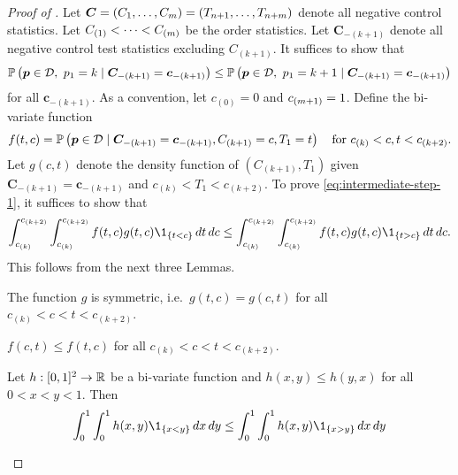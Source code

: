 \begin{proof}[Proof of ]
Let $\bm C = (C_1,\dotsc,C_{m}) = (T_{{n}+1}, \dotsc,
T_{{n}+m})$ denote all negative control statistics. Let $C_{(1)} <
\dotsb < C_{(m)}$ be the order statistics. Let
$\boldsymbol{C}_{-(k+1)}$ denote all negative control test
statistics excluding $C_{(k+1)}$. It suffices to show that
\begin{align} \label{eq:intermediate-step-1}
    \mathbb{P}\left({\boldsymbol{p}} \in \mathcal{D}, ~{p_{1}} = k \mid \boldsymbol{C}_{-(k+1)}
  = \boldsymbol{c}_{-(k+1)}\right) \le \mathbb{P}\left({\boldsymbol{p}} \in \mathcal{D}, ~{p_{1}} =
  k+1 \mid \boldsymbol{C}_{-(k+1)} = \boldsymbol{c}_{-(k+1)}\right)
\end{align}
for all $\bm c_{-(k+1)}$. As a convention, let $c_{(0)} = 0$ and
$c_{(m+1)} = 1$. Define the bi-variate function
\begin{align*}
    f(t, c) = \mathbb{P}\left({\boldsymbol{p}} \in \mathcal{D} \mid \boldsymbol{C}_{-(k+1)}
  = \boldsymbol{c}_{-(k+1)}, C_{(k+1)} = c, {T_{1}} = t
  \right) \quad \text{for}~c_{(k)} < c, t < c_{(k+2)}.
\end{align*}
Let $g(c,t)$ denote the density function of $(C_{(k+1)}, T_1)$ given
$\boldsymbol{C}_{-(k+1)} = \boldsymbol{c}_{-(k+1)}$ and $c_{(k)} < T_1
< c_{(k+2)}$.
To prove \eqref{eq:intermediate-step-1}, it suffices to show that
\[
  \int_{c_{(k)}}^{c_{(k+2)}} \int_{c_{(k)}}^{c_{(k+2)}} f(t,c) g(t,c) \1_{\{t
    < c\}} \,dt\, dc \leq \int_{c_{(k)}}^{c_{(k+2)}}
  \int_{c_{(k)}}^{c_{(k+2)}} f(t,c) g(t,c) \1_{\{t > c\}} \,dt\,dc.
\]
This follows from the next three Lemmas.

\begin{lemma} \label{lemm:symmetric-g}
The function $g$ is symmetric, i.e.\ $g(t,c) = g(c,t)$ for all
$c_{(k)} < c < t < c_{(k+2)}$.
\end{lemma}

\begin{lemma} \label{lemm:symmetric-inequality}
  $f(c,t) \leq f(t,c)$ for all $c_{(k)} < c < t < c_{(k+2)}$.
\end{lemma}

\begin{lemma}\label{lemm:PRDS}
Let $h: [0,1]^2 \to \mathbb{R}$ be a bi-variate function and $h(x,y) \leq
h(y,x)$ for all $0 < x < y < 1$. Then
\begin{align*}
  \int_0^1 \int_0^1 h(x,y) \1_{\{x < y\}} \, dx \, dy \leq \int_0^1
  \int_0^1 h(x,y) \1_{\{x > y\}} \, dx \, dy
\end{align*}
\end{lemma}


\end{proof}
